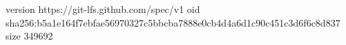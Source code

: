 version https://git-lfs.github.com/spec/v1
oid sha256:b5a1e164f7ebfae56970327c5bbcba7888e0cb4d4a6d1c90c451c3d6f6c8d837
size 349692
